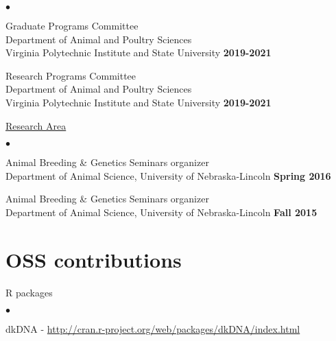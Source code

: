 \documentclass[margin,line,10pt]{res}
\newenvironment{list1}{
  \begin{list}{\ding{113}}{%
      \setlength{\itemsep}{0in}
      \setlength{\parsep}{0in} \setlength{\parskip}{0in}
      \setlength{\topsep}{0in} \setlength{\partopsep}{0in} 
      \setlength{\leftmargin}{0.17in}}}{\end{list}}
\newenvironment{list2}{
  \begin{list}{$\bullet$}{%
      \setlength{\itemsep}{0in}
      \setlength{\parsep}{0in} \setlength{\parskip}{0in}
      \setlength{\topsep}{0in} \setlength{\partopsep}{0in} 
      \setlength{\leftmargin}{0.2in}}}{\end{list}}
\begin{document}
\begin{resume}
\begin{list2}
    \vspace{0.3cm}


\item Graduate Programs Committee \\
  Department of Animal and Poultry Sciences \\ Virginia Polytechnic Institute and State University   \hfill \textbf{2019-2021}\\

  \vspace{0.3cm}
  
\item Research Programs Committee \\
  Department of Animal and Poultry Sciences \\ Virginia Polytechnic Institute and State University  \hfill \textbf{2019-2021}\\

  \vspace{0.3cm}

\end{list2}


\begin{flushleft}
\hspace{0.3cm} \underline{Research Area}
\end{flushleft}
\begin{list2}
\item Animal Breeding \& Genetics Seminars organizer \\
  Department of Animal Science, University of Nebraska-Lincoln   \hfill \textbf{Spring 2016}\\

\item Animal Breeding \& Genetics Seminars organizer \\
  Department of Animal Science, University of Nebraska-Lincoln   \hfill \textbf{Fall 2015}\\
\end{list2}






\vspace{0.5cm}
\section{\sc OSS contributions} 
\begin{list1}
\item[] R packages
\begin{list2}
\item dkDNA - \textcolor{blue}{\href{http://cran.r-project.org/web/packages/dkDNA/index.html}{http://cran.r-project.org/web/packages/dkDNA/index.html}}
\end{list2}



\end{list1}
\end{resume}
\end{document}
